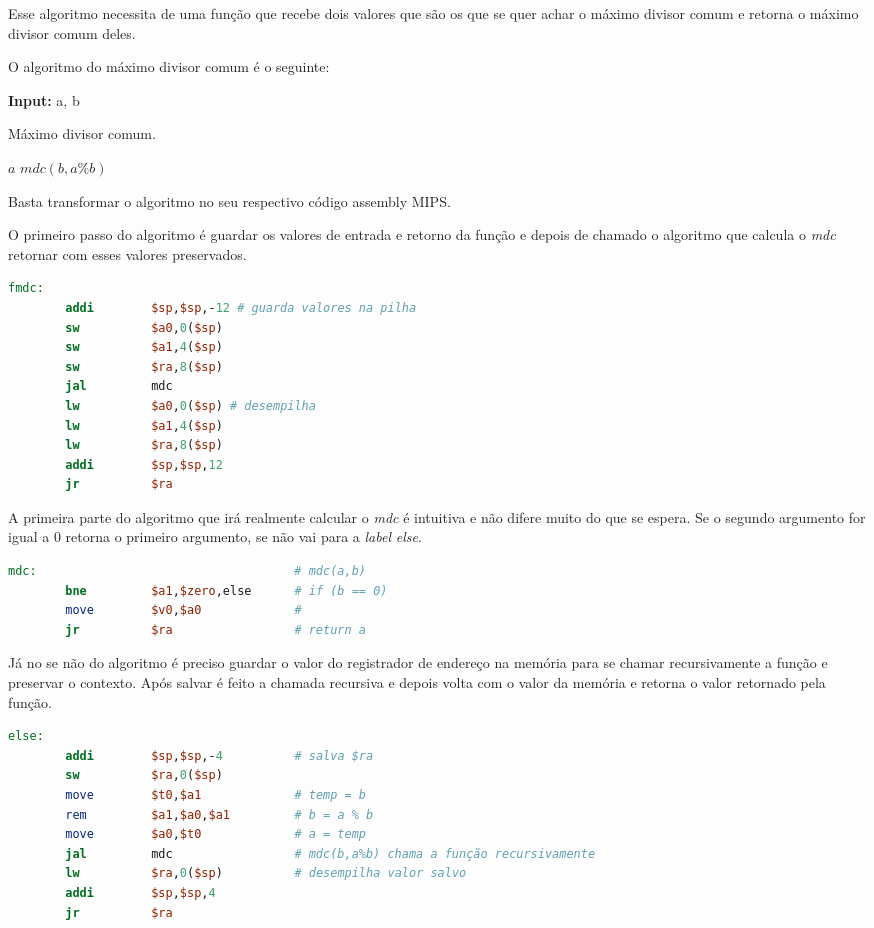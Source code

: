 \documentclass[12pt]{article}
\begin{document}
Esse algoritmo necessita de uma função que recebe dois valores que são os que se quer achar o máximo divisor comum e retorna o máximo divisor comum deles.

O algoritmo do máximo divisor comum é o seguinte:

\begin{algorithm}
\textbf{Input:} a, b
\caption{Máximo divisor comum.}\label{alg:maxSubSquareGreedy}
\begin{algorithmic}[1]
\State \Return $a$
\Else
\State \Return $mdc(b,a \% b)$
\EndIf
\EndProcedure
\end{algorithmic}
\end{algorithm}

Basta transformar o algoritmo no seu respectivo código assembly MIPS.

O primeiro passo do algoritmo é guardar os valores de entrada e retorno da função e depois de chamado o algoritmo que calcula o \emph{mdc} retornar com esses valores preservados.

\begin{lstlisting}[language = mips]
fmdc:
        addi        $sp,$sp,-12 # guarda valores na pilha
        sw          $a0,0($sp)
        sw          $a1,4($sp)
        sw          $ra,8($sp)
        jal         mdc
        lw          $a0,0($sp) # desempilha
        lw          $a1,4($sp)
        lw          $ra,8($sp)
        addi        $sp,$sp,12
        jr          $ra
\end{lstlisting}




A primeira parte do algoritmo que irá realmente calcular o \emph{mdc} é intuitiva e não difere muito do que se espera. Se o segundo argumento for igual a 0 retorna o primeiro argumento, se não vai para a \emph{label} \emph{else}.
\begin{lstlisting}[language = mips]
mdc:                                    # mdc(a,b)
        bne         $a1,$zero,else      # if (b == 0)
        move        $v0,$a0             #
        jr          $ra                 # return a
\end{lstlisting}

Já no se não do algoritmo é preciso guardar o valor do registrador de endereço na memória para se chamar recursivamente a função e preservar o contexto. Após salvar é feito a chamada recursiva e depois volta com o valor da memória e retorna o valor retornado pela função.

\begin{lstlisting}[language = mips]
else:
        addi        $sp,$sp,-4          # salva $ra
        sw          $ra,0($sp)
        move        $t0,$a1             # temp = b
        rem         $a1,$a0,$a1         # b = a % b
        move        $a0,$t0             # a = temp
        jal         mdc                 # mdc(b,a%b) chama a função recursivamente
        lw          $ra,0($sp)          # desempilha valor salvo
        addi        $sp,$sp,4
        jr          $ra
\end{lstlisting}
\end{document}

